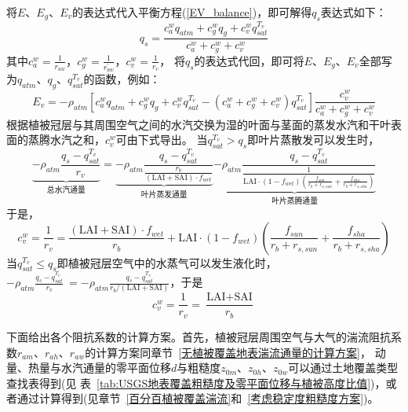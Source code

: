 将$E$、$E_{g}$、$E_{v}$的表达式代入平衡方程(\ref{EV_balance})，即可解得$q_s$表达式如下：
\begin{equation}\label{Eg_2}
q_{s}=\frac{c_{a}^{w} q_{atm}+c_{g}^{w} q_{g}+c_{v}^{w} q_{s a t}^{T_{v}}}{c_{a}^{w}+c_{g}^{w}+c_{v}^{w}}
\end{equation}
其中$c_a^w=\frac{1}{r_{aw}}$，$c_g^w=\frac{1}{r_{aw}^\prime}$，$c_v^w=\frac{1}{r_{v}}$，
将$q_s$的表达式代回，即可将$E$、$E_{g}$、$E_{v}$全部写为$q_{atm}$、$q_g$、$q_{sat}^{T_v}$的函数，例如：
\begin{equation}\label{Ev}
E_{v}=-\rho_{atm}\left[c_{a}^{w} q_{atm}+c_{g}^{w} q_{g}+c_{v}^{w} q_{s a t}^{T_{v}}-
\left(c_{a}^{w}+c_{g}^{w}+c_{v}^{w}\right) q_{s a t}^{T_{v}}\right] \frac{c_{v}^{w}}{c_{a}^{w}+c_{g}^{w}+c_{v}^{w}}
\end{equation}
根据植被冠层与其周围空气之间的水汽交换为湿的叶面与茎面的蒸发水汽和干叶表面的蒸腾水汽之和，$c_v^w$可由下式导出。
当$q_{sat}^{T_v}>q_s$即叶片蒸散发可以发生时，%
\begin{equation}
\underbrace{-\rho_{atm} \frac{q_{s}-q_{s a t}^{T_{v}}}{r_{{v }}}}_{\text{总水汽通量}}
=\underbrace{-\rho_{atm} 
\frac{q_{s}-q_{s a t}^{T_{v}}}{\frac{r_{b}}{(\text {LAI}+\text {SAI}) \cdot f_{{wet }}}}}_{\text{叶片蒸发通量}}
\underbrace{-\rho_{atm} \frac{q_{s}-q_{s a t}^{T_{v}}}{\frac{1}{\text {LAI} \cdot \left(1-f_{wet}\right)\left(\frac{f_{sun}}{r_{b}+r_{s,sun}} + \frac{f_{sha}}{r_{b}+r_{s,sha}}\right)}}}_{\text{叶片蒸腾通量}}
\end{equation}
于是，
\begin{equation}
c_{v}^{w}=\frac{1}{r_{v}}=\frac{(\text {LAI}+\text {SAI}) \cdot f_{{wet }}}{r_{b}}+\text {LAI} \cdot \left(1-f_{wet}\right)\left(\frac{f_{sun}}{r_{b}+r_{s,sun}} + \frac{f_{sha}}{r_{b}+r_{s,sha}}\right)
\end{equation}
当$q_{sat}^{T_v}\le q_s$即植被冠层空气中的水蒸气可以发生液化时，
$-\rho_{atm}\frac{q_s-q_{sat}^{T_v}}{r_{v}}\ =-\rho_{atm} \frac{q_s-q_{sat}^{T_v}}{r_b/\left(\text {LAI}+\text {SAI}\right)}$，于是
\begin{equation}
c_{v}^{w}=\frac{1}{r_{{v }}}=\frac{\text {LAI}+\text {SAI}}{r_{b}}
\end{equation}

下面给出各个阻抗系数的计算方案。首先，植被冠层周围空气与大气的湍流阻抗系数$r_{am}$、$r_{ah}$、$r_{aw}$的计算方案同章节~\ref{无植被覆盖地表湍流通量的计算方案}，
动量、热量与水汽通量的零平面位移$d$与粗糙度$z_{0m}$、$z_{0h}$、$z_{0w}$可以通过土地覆盖类型查找表得到(见
表~\ref{tab:USGS地表覆盖粗糙度及零平面位移与植被高度比值})，或者通过计算得到(见章节~\ref{百分百植被覆盖湍流}和~\ref{考虑稳定度粗糙度方案})。

